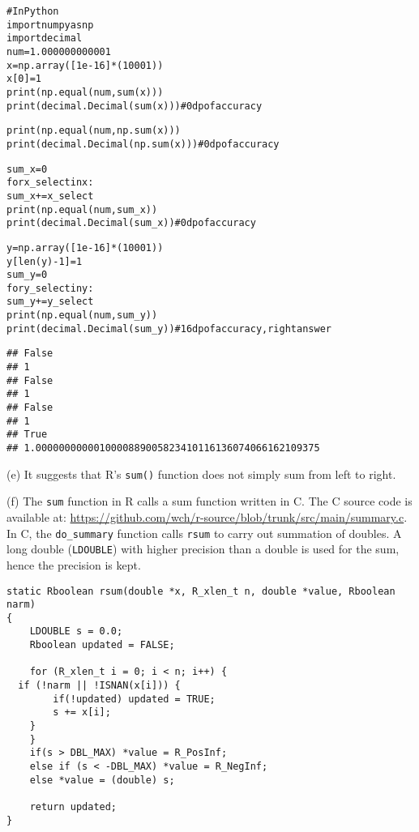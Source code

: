\documentclass{article}\usepackage[]{graphicx}\usepackage[]{color}
\makeatletter
\newenvironment{kframe}{%
 \def\at@end@of@kframe{}%
 \ifinner\ifhmode%
  \def\at@end@of@kframe{\end{minipage}}%
  \begin{minipage}{\columnwidth}%
 \fi\fi%
 \def\FrameCommand##1{\hskip\@totalleftmargin \hskip-\fboxsep
 \colorbox{shadecolor}{##1}\hskip-\fboxsep
     \hskip-\linewidth \hskip-\@totalleftmargin \hskip\columnwidth}%
 \MakeFramed {\advance\hsize-\width
   \@totalleftmargin\z@ \linewidth\hsize
   \@setminipage}}%
 {\par\unskip\endMakeFramed%
 \at@end@of@kframe}
\newenvironment{knitrout}{}{} %
\makeatother
\begin{document}
\begin{knitrout}
\color{fgcolor}\begin{kframe}
\begin{alltt}
# In Python
import numpy as np
import decimal
num = 1.000000000001
x = np.array([1e-16]*(10001))
x[0] = 1
print(np.equal(num, sum(x)))
print(decimal.Decimal(sum(x))) # 0 dp of accuracy

print(np.equal(num, np.sum(x)))
print(decimal.Decimal(np.sum(x))) # 0 dp of accuracy

sum_x = 0
for x_select in x:
  sum_x += x_select
print(np.equal(num, sum_x))
print(decimal.Decimal(sum_x)) # 0 dp of accuracy

y = np.array([1e-16]*(10001))
y[len(y)-1] = 1
sum_y = 0
for y_select in y:
  sum_y += y_select
print(np.equal(num, sum_y))
print(decimal.Decimal(sum_y)) # 16 dp of accuracy, right answer
\end{alltt}

\begin{verbatim}
## False
## 1
## False
## 1
## False
## 1
## True
## 1.0000000000010000889005823410116136074066162109375
\end{verbatim}
\end{kframe}
\end{knitrout}

(e) It suggests that R's \texttt{sum()} function does not simply sum from left to right.

(f) The \texttt{sum} function in R calls a sum function written in C. The C source code is available at: \url{https://github.com/wch/r-source/blob/trunk/src/main/summary.c}. In C, the \texttt{do\_summary} function calls \texttt{rsum} to carry out summation of doubles. A long double (\texttt{LDOUBLE}) with higher precision than a double is used for the sum, hence the precision is kept.

\begin{verbatim}
static Rboolean rsum(double *x, R_xlen_t n, double *value, Rboolean narm)
{
    LDOUBLE s = 0.0;
    Rboolean updated = FALSE;

    for (R_xlen_t i = 0; i < n; i++) {
  if (!narm || !ISNAN(x[i])) {
	    if(!updated) updated = TRUE;
	    s += x[i];
	}
    }
    if(s > DBL_MAX) *value = R_PosInf;
    else if (s < -DBL_MAX) *value = R_NegInf;
    else *value = (double) s;

    return updated;
}
\end{verbatim}
\end{document}

